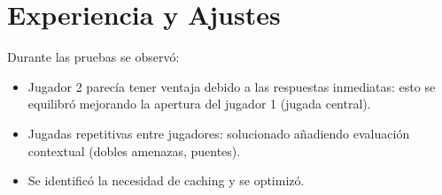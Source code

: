\documentclass[12pt]{article}
\begin{document}
\section{Experiencia y Ajustes}
Durante las pruebas se observó:

\begin{itemize}
  \item Jugador 2 parecía tener ventaja debido a las respuestas inmediatas: esto se equilibró mejorando la apertura del jugador 1 (jugada central).
  \item Jugadas repetitivas entre jugadores: solucionado añadiendo evaluación contextual (dobles amenazas, puentes).
  \item Se identificó la necesidad de caching y se optimizó.
\end{itemize}
\end{document}
